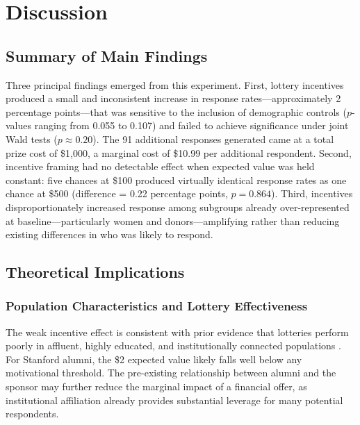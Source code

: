 \section{Discussion}

\subsection{Summary of Main Findings}

Three principal findings emerged from this experiment. First, lottery incentives produced
a small and inconsistent increase in response rates---approximately 2 percentage
points---that was sensitive to the inclusion of demographic controls ($p$-values ranging
from 0.055 to 0.107) and failed to achieve significance under joint Wald tests
($p \approx 0.20$). The 91 additional responses generated came at a total prize cost of
\$1,000, a marginal cost of \$10.99 per additional respondent. Second, incentive framing
had no detectable effect when expected value was held constant: five chances at \$100
produced virtually identical response rates as one chance at \$500 (difference = 0.22
percentage points, $p = 0.864$). Third, incentives disproportionately increased response
among subgroups already over-represented at baseline---particularly women and
donors---amplifying rather than reducing existing differences in who was likely to
respond.

\subsection{Theoretical Implications}

\subsubsection{Population Characteristics and Lottery Effectiveness}

The weak incentive effect is consistent with prior evidence that lotteries perform poorly
in affluent, highly educated, and institutionally connected populations
\parencite{Cottrell.etal2015, Denton.Tsai1991}. For Stanford alumni, the \$2 expected value likely
falls well below any motivational threshold. The pre-existing relationship between alumni
and the sponsor may further reduce the marginal impact of a financial offer, as
institutional affiliation already provides substantial leverage for many potential
respondents.

